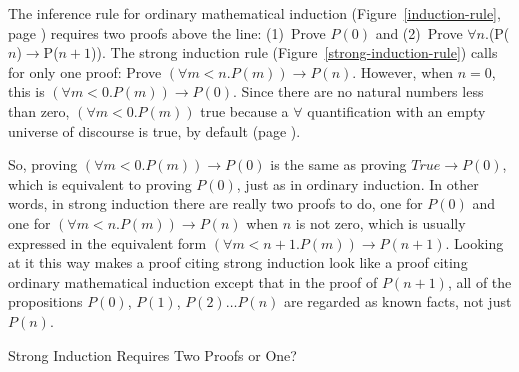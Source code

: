 \begin{aside}
The inference rule for ordinary mathematical induction
(Figure~\ref{induction-rule}, page \pageref{induction-rule})
requires two proofs above the line:
(1)~Prove $P(0)$ and (2)~Prove $\forall$$n$.(P($n$)$\rightarrow$P($n+1$)).
The strong induction rule
(Figure~\ref{strong-induction-rule})
calls for only one proof:
Prove $(\forall m<n.P(m))\rightarrow P(n)$.
However, when $n = 0$, this is
$(\forall m<0.P(m))\rightarrow P(0)$.
Since there
are no natural numbers less than zero,
$(\forall m<0.P(m))$ true because
a $\forall$ quantification with an empty universe of discourse
is true, by default
(page \pageref{empty-forall}).

So, proving $(\forall m<0.P(m))\rightarrow P(0)$
is the same as proving $True \rightarrow P(0)$,
which is equivalent to proving $P(0)$,
just as in ordinary induction.
In other words, in strong induction there are really two proofs to do,
one for $P(0)$ and one for $(\forall m<n.P(m))\rightarrow P(n)$
when $n$ is not zero, which is usually expressed in the
equivalent form $(\forall m<n+1.P(m))\rightarrow P(n+1)$.
Looking at it this way makes a proof citing strong induction look like
a proof citing ordinary mathematical induction except that
in the proof of $P(n+1)$, all of the propositions
$P(0)$, $P(1)$, $P(2) \dots P(n)$
are regarded as known facts, not just $P(n)$.
\caption{Strong Induction Requires Two Proofs or One?}
\label{strong-induction-rule-2-hyps-or-1}
\end{aside}


